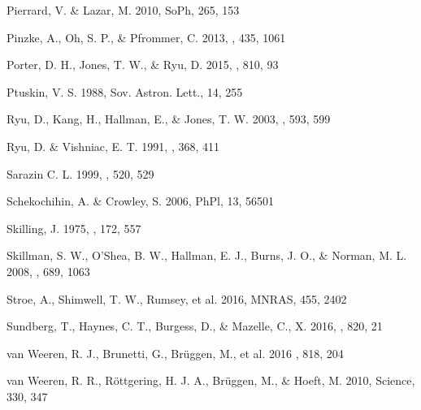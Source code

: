 \documentclass[twocolumn]{aastex61}
\begin{document}
\begin{thebibliography}{}
Pierrard, V. \& Lazar, M. 2010, SoPh, 265, 153

Pinzke, A., Oh, S. P., \& Pfrommer, C. 2013,
\mnras, 435, 1061 

Porter, D. H., Jones, T. W., \& Ryu, D. 2015, \apj, 810, 93

Ptuskin, V. S. 1988,
Sov. Astron. Lett., 14, 255

Ryu, D., Kang, H., Hallman, E., \& Jones, T. W. 2003, 
\apj, 593, 599

Ryu, D. \& Vishniac, E. T. 1991,
\apj, 368, 411

Sarazin C. L. 1999, 
\apj, 520, 529

Schekochihin, A. \& Crowley, S. 2006, PhPl, 13, 56501

Skilling, J. 1975,
\mnras, 172, 557

Skillman, S. W., O'Shea, B. W., Hallman, E. J., Burns, J. O., \& Norman, M. L. 2008, \apj, 689, 1063 

Stroe, A., Shimwell, T. W., Rumsey, et al. 2016,
MNRAS, 455, 2402

Sundberg, T., Haynes, C. T., Burgess, D., \& Mazelle, C., X. 2016,
\apj, 820, 21

van Weeren, R. J., Brunetti, G., Br\"uggen, M., et al. 2016 
\apj, 818, 204


van Weeren, R. R., R\"ottgering, H. J. A., Br\"uggen, M., \& Hoeft, M. 2010, 
Science, 330, 347


\end{thebibliography}
\end{document}

